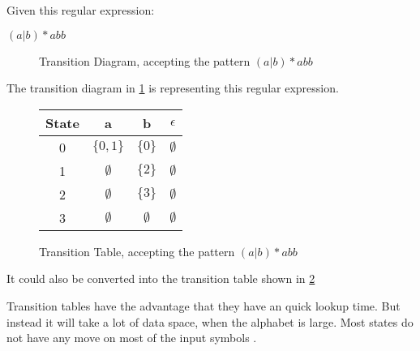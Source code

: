 \begin{example} \label{regexp2td}
Given this regular expression:
\begin{center}
    $(a | b)* abb$ 
\end{center}

\begin{figure}[h!]
  \centering
  \caption{Transition Diagram, accepting the pattern $(a | b)* abb$
  \label{fig:td}}
\end{figure}

The transition diagram in \cref{fig:td} is representing this regular expression.

\begin{figure}[h!]
  \centering
  \begin{tabular}{| c | c c c |}
    \hline
    \hline
    State & a & b & $\epsilon$\\
    \hline
    0 & $\{0, 1\}$ & $\{0\}$ & $\emptyset$ \\
    1 & $\emptyset$ & $\{2\}$ & $\emptyset$ \\
    2 & $\emptyset$ & $\{3\}$ & $\emptyset$ \\
    3 & $\emptyset$ & $\emptyset$ & $\emptyset$ \\
    \hline
  \end{tabular}
  \caption{Transition Table, accepting the pattern $(a | b)* abb$
  \label{fig:tt}}
\end{figure}

It could also be converted into the transition table shown in \cref{fig:tt}
\end{example}

Transition tables have the advantage that they have an quick lookup time. But 
instead it will take a lot of data space, when the alphabet is large. Most 
states do not have any move on most of the input symbols \cite{Aho2006}.
